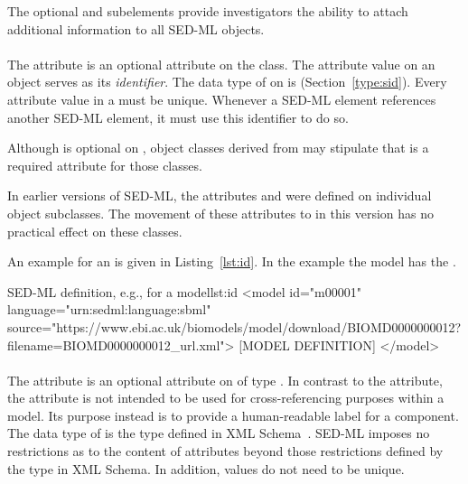 The optional \hyperref[sec:notesElement]{} and \hyperref[sec:annotationElement]{} subelements provide investigators the ability to attach additional information to all SED-ML objects.


\paragraph*{}
\label{sec:id}
The  attribute is an optional attribute on the \SEDBase class.  The  attribute value on an object serves as its \emph{identifier}.  The data type of  on \SEDBase is  (Section~\ref{type:sid}).  Every  attribute value in a \SedDocument must be unique.  Whenever a SED-ML element references another SED-ML element, it must use this identifier to do so.

Although  is optional on \SEDBase, object classes derived from \SEDBase may stipulate that  is a required attribute for those classes.

In earlier versions of SED-ML, the attributes  and  were defined on individual object subclasses.  The movement of these attributes to \SEDBase in this version has no practical effect on these classes.

An example for an  is given in Listing~\ref{lst:id}. In the example the model has the  .

\begin{myXmlLst}{SED-ML  definition, e.g., for a model}{lst:id}
<model id="m00001" language="urn:sedml:language:sbml"
        source="https://www.ebi.ac.uk/biomodels/model/download/BIOMD0000000012?filename=BIOMD0000000012_url.xml">
	[MODEL DEFINITION]
</model>
\end{myXmlLst}


\paragraph*{}
\label{sec:name}
The attribute  is an optional attribute on \SEDBase of type .  
In contrast to the  attribute, the  attribute
is not intended to be used for cross-referencing
purposes within a model.  Its purpose instead is to provide a
human-readable label for a component.  The data type of 
 is the type  defined in XML
Schema~\citep{biron:2000,thompson:2000}.  SED-ML imposes no restrictions
as to the content of  attributes beyond those restrictions
defined by the  type in XML Schema.
In addition,  values do not need to be unique.

